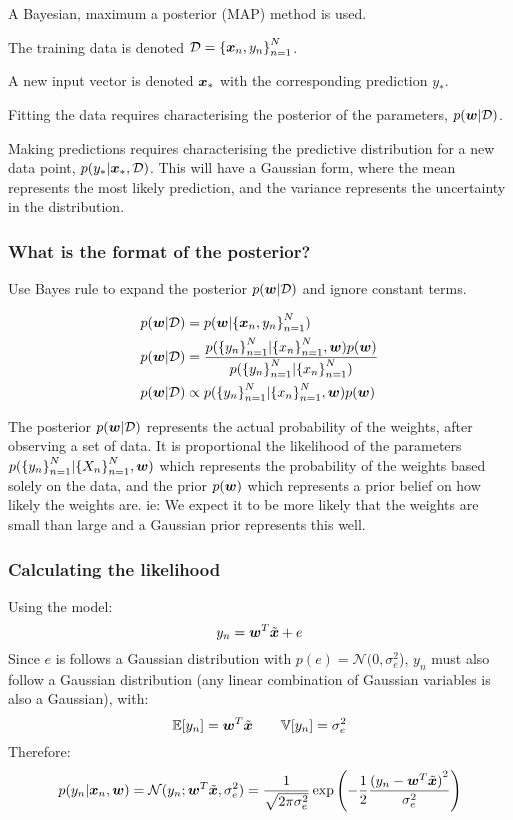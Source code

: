 \documentclass[../../main.tex]{subfiles}
\begin{document}
A Bayesian, maximum a posterior (MAP) method is used.

The training data is denoted $\mathcal{D} = {\{\bm{x}_n, y_n\}}_{n=1}^N$.

A new input vector is denoted $\bm{x}_*$ with the corresponding prediction $y_*$.

Fitting the data requires characterising the posterior of the parameters, $p(\bm{w} | \mathcal{D})$.

Making predictions requires characterising the predictive distribution for a new data point, $p(y_* | \bm{x}_*, \mathcal{D})$.
This will have a Gaussian form, where the mean represents the most likely prediction, and the variance represents the uncertainty in the distribution.

\subsubsection{What is the format of the posterior?}

Use Bayes rule to expand the posterior $p(\bm{w} | \mathcal{D})$ and ignore constant terms.

\begin{align*}
p(\bm{w} | \mathcal{D}) &=
    p(\bm{w} | {\{\bm{x}_n, y_n\}}_{n=1}^N) \\
p(\bm{w} | \mathcal{D}) &=
    \frac
        {p({\{y_n\}}_{n=1}^N | {\{x_n\}}_{n=1}^N, \bm{w})
            p(\bm{w})}
        {p({\{y_n\}}_{n=1}^N | {\{x_n\}}_{n=1}^N)} \\
p(\bm{w} | \mathcal{D}) &\propto
    p({\{y_n\}}_{n=1}^N | {\{x_n\}}_{n=1}^N, \bm{w})
    p(\bm{w})
\end{align*}

The posterior $p(\bm{w} | \mathcal{D})$ represents the actual probability of the weights, after observing a set of data.
It is proportional the likelihood of the parameters $p({\{y_n\}}_{n=1}^N | {\{X_n\}}_{n=1}^N, \bm{w})$ which represents the probability of the weights based solely on the data, and the prior $p(\bm{w})$ which represents a prior belief on how likely the weights are.
ie: We expect it to be more likely that the weights are small than large and a Gaussian prior represents this well.

\subsubsection{Calculating the likelihood}

Using the model:
\[ y_n = \bm{w}^T\tilde{\bm{x}} + e \]
Since $e$ is follows a Gaussian distribution with $p(e) = \mathcal{N}(0, \sigma_e^2$), $y_n$ must also follow a Gaussian distribution (any linear combination of Gaussian variables is also a Gaussian), with:
\[ \mathbb{E}[y_n] = \bm{w}^T\tilde{\bm{x}} \quad\quad \mathbb{V}[y_n] = \sigma_e^2 \]
Therefore:
\[ p(y_n | \bm{x}_n , \bm{w}) = \mathcal{N}(y_n ; \bm{w}^T\tilde{\bm{x}}, \sigma_e^2) = \frac{1}{\sqrt{2\pi \sigma_e^2}}\exp{\left(-\frac{1}{2}\frac{{(y_n -  \bm{w} ^T\tilde{ \bm{x} })}^2}{\sigma_e^2}\right)}\]
\end{document}
